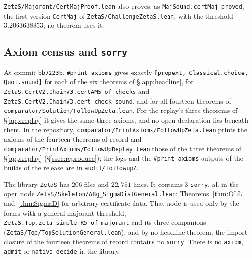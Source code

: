 


\texttt{ZetaS/Majorant/CertMajProof.lean} also proves, as \texttt{MajSound.certMaj\_proved}, the first version \texttt{CertMaj} of
\texttt{ZetaS/ChallengeZetaS.lean}, with the threshold $3.2063638853$; no theorem uses it.

\subsection{Axiom census and \texttt{sorry}}\label{app:census}
At commit \texttt{bb7223b}, \texttt{\#print axioms} gives exactly \texttt{[propext, Classical.choice, Quot.sound]} for
each of the six theorems of \S\ref{app:headline}, for \texttt{ZetaS.CertV2.ChainV3.certAM5\_of\_checks} and
\texttt{ZetaS.CertV2.ChainV3.cert\_check\_sound}, and for all fourteen theorems of
\texttt{comparator/Solution/FollowUpZeta.lean}. For the replay's three theorems of \S\ref{app:replay} it gives the same three axioms, and
no open declaration lies beneath them. In the repository,
\texttt{comparator/PrintAxioms/FollowUpZeta.lean} prints the axioms of the fourteen theorems of record and
\texttt{comparator/PrintAxioms/FollowUpReplay.lean} those of the three theorems of \S\ref{app:replay} (\S\ref{ssec:reproduce}); the logs and
the \texttt{\#print axioms} outputs of the builds of the release are in \texttt{audit/followup/}.

The library \texttt{ZetaS} has $206$ files and $22{,}751$ lines. It contains $3$ \texttt{sorry}, all in the open node
\texttt{ZetaS/Skeleton/A8g\_SigmaDistGeneral.lean}: Theorems~\ref{thm:OLL} and~\ref{thm:SigmaD} for arbitrary certificate data. That node
is used only by the forms with a general majorant threshold, \texttt{ZetaS.Top.zeta\_simple\_K5\_of\_majorant} and its three companions
(\texttt{ZetaS/Top/TopSolutionGeneral.lean}), and by no headline theorem; the import closure of the fourteen theorems of record contains
no \texttt{sorry}. There is no \texttt{axiom}, \texttt{admit} or \texttt{native\_decide} in the library.

